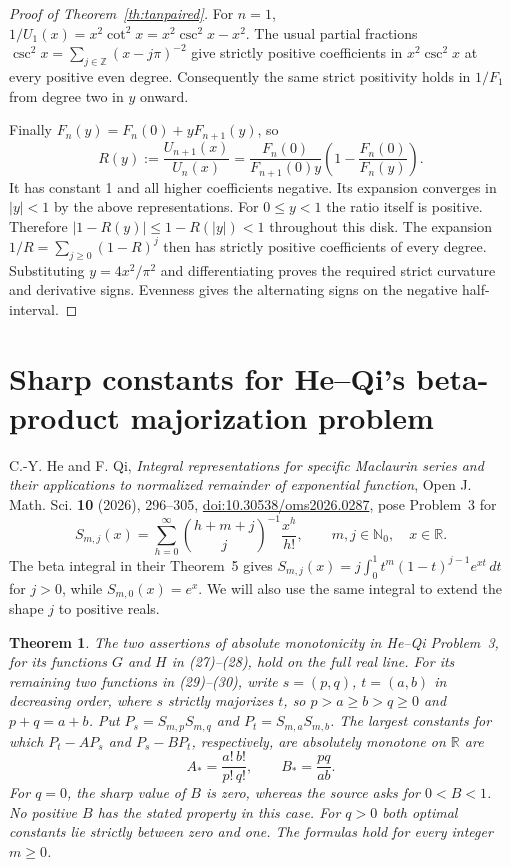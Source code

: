 \documentclass[11pt,a4paper]{article}
\newtheorem{theorem}{Theorem}[section]
\numberwithin{equation}{section}
\begin{document}
\begin{proof}[Proof of Theorem~\ref{th:tanpaired}]
For $n=1$, $1/U_1(x)=x^2\cot^2 x=x^2\csc^2 x-x^2$.
The usual partial fractions $\csc^2x=\sum_{j\in\mathbb Z}(x-j\pi)^{-2}$
give strictly positive coefficients in $x^2\csc^2x$ at every positive
even degree. Consequently the same strict positivity holds in $1/F_1$
from degree two in $y$ onward.

Finally $F_n(y)=F_n(0)+yF_{n+1}(y)$, so
\[
 R(y):=\frac{U_{n+1}(x)}{U_n(x)}
  =\frac{F_n(0)}{F_{n+1}(0)y}\left(1-\frac{F_n(0)}{F_n(y)}\right).
\]
It has constant 1 and all higher coefficients negative. Its expansion
converges in $|y|<1$ by the above representations. For $0\le y<1$
the ratio itself is positive. Therefore
$|1-R(y)|\le1-R(|y|)<1$ throughout this disk. The expansion
$1/R=\sum_{j\ge0}(1-R)^j$ then has strictly positive coefficients
of every degree. Substituting $y=4x^2/\pi^2$ and differentiating
proves the required strict curvature and derivative signs. Evenness
gives the alternating signs on the negative half-interval.
\end{proof}


\section{Sharp constants for He--Qi's beta-product majorization problem}
\label{sec:hqmajor}
C.-Y. He and F. Qi, \emph{Integral representations for specific Maclaurin
series and their applications to normalized remainder of exponential
function}, Open J. Math. Sci. \textbf{10} (2026), 296--305,
\href{https://doi.org/10.30538/oms2026.0287}{doi:10.30538/oms2026.0287},
pose Problem~3 for
\[
 S_{m,j}(x)=\sum_{h=0}^\infty
 \binom{h+m+j}{j}^{-1}\frac{x^h}{h!},
 \qquad m,j\in\mathbb N_0,\quad x\in\mathbb R .
\]
The beta integral in their Theorem~5 gives
$S_{m,j}(x)=j\int_0^1 t^m(1-t)^{j-1}e^{xt}\,dt$ for $j>0$,
while $S_{m,0}(x)=e^x$. We will also use the same integral to
extend the shape $j$ to positive reals.

\begin{theorem}\label{hq:sharp}
The two assertions of absolute monotonicity in He--Qi Problem~3,
for its functions $G$ and $H$ in (27)--(28), hold on the full real
line. For its remaining two functions in (29)--(30), write
$s=(p,q)$, $t=(a,b)$ in decreasing order, where $s$ strictly
majorizes $t$, so $p>a\ge b>q\ge0$ and $p+q=a+b$.
Put $P_s=S_{m,p}S_{m,q}$ and $P_t=S_{m,a}S_{m,b}$.
The largest constants for which $P_t-A P_s$ and $P_s-B P_t$,
respectively, are absolutely monotone on $\mathbb R$ are
\[
       A_* = \frac{a!\, b!}{p!\,q!},
       \qquad B_* = \frac{pq}{ab}.
\]
For $q=0$, the sharp value of $B$ is zero, whereas the source asks
for $0<B<1$. No positive $B$ has the stated property in this case.
For $q>0$ both optimal constants lie strictly between zero and one.
The formulas hold for every integer $m\ge0$.
\end{theorem}
\end{document}
